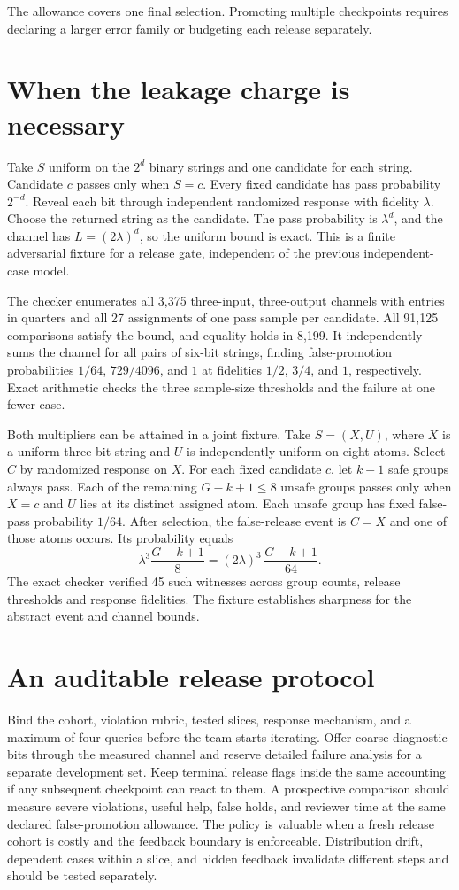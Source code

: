 \documentclass[11pt]{article}
\begin{document}
The allowance covers one final selection. Promoting multiple
checkpoints requires declaring a larger error family or budgeting
each release separately.

\section{When the leakage charge is necessary}
Take $S$ uniform on the $2^d$ binary strings and one candidate for
each string. Candidate $c$ passes only when $S=c$. Every fixed
candidate has pass probability $2^{-d}$. Reveal each bit through
independent randomized response with fidelity $\lambda$. Choose
the returned string as the candidate. The pass probability is
$\lambda^d$, and the channel has $L=(2\lambda)^d$, so the uniform
bound is exact. This is a finite adversarial fixture for a release
gate, independent of the previous independent-case model.

The checker enumerates all 3,375 three-input, three-output
channels with entries in quarters and all 27 assignments of one
pass sample per candidate. All 91,125 comparisons satisfy the
bound, and equality holds in 8,199. It independently sums the
channel for all pairs of six-bit strings, finding false-promotion
probabilities $1/64$, $729/4096$, and $1$ at fidelities
$1/2$, $3/4$, and $1$, respectively. Exact arithmetic checks the
three sample-size thresholds and the failure at one fewer case.

Both multipliers can be attained in a joint fixture. Take $S=(X,U)$,
where $X$ is a uniform three-bit string and $U$ is independently
uniform on eight atoms. Select $C$ by randomized response on $X$.
For each fixed candidate $c$, let $k-1$ safe groups always pass.
Each of the remaining $G-k+1\le8$ unsafe groups passes only when
$X=c$ and $U$ lies at its distinct assigned atom. Each unsafe
group has fixed false-pass probability $1/64$. After selection,
the false-release event is $C=X$ and one of those atoms occurs.
Its probability equals
\[
 \lambda^3\frac{G-k+1}{8}
   =(2\lambda)^3\,\frac{G-k+1}{64}.
\]
The exact checker verified 45 such witnesses across group counts,
release thresholds and response fidelities. The fixture establishes
sharpness for the abstract event and channel bounds.

\section{An auditable release protocol}
Bind the cohort, violation rubric, tested slices, response
mechanism, and a maximum of four queries before the team starts
iterating. Offer coarse diagnostic bits through the measured
channel and reserve detailed failure analysis for a separate
development set. Keep terminal release flags inside the same
accounting if any subsequent checkpoint can react to them.
A prospective comparison should measure severe violations,
useful help, false holds, and reviewer time at the same declared
false-promotion allowance. The policy is valuable when a fresh
release cohort is costly and the feedback boundary is enforceable.
Distribution drift, dependent cases within a slice, and hidden
feedback invalidate different steps and should be tested separately.
\end{document}
